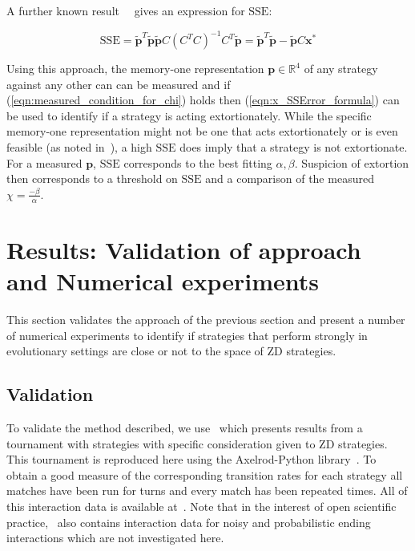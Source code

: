 \documentclass[a4paper]{article}
\newcommand{\SSe}{\text{SSE}}
\begin{document}
A further known result~~\cite{kutner2004applied, rao1973linear,
wakefield2013bayesian} gives an expression for
\(\SSe\):

\begin{equation}\label{eqn:x_SSError_formula}
    \SSe = {\tilde{\textbf{p}}} ^ T \tilde{\textbf{p}}
           \tilde{\textbf{p}} C \left(C ^ T C \right) ^ {-1} C ^ T
           \tilde{\textbf{p}} = {\tilde{\textbf{p}}} ^ T \tilde{\textbf{p}} - \tilde{\textbf{p}} C \textbf{x}^*
\end{equation}

Using this approach, the memory-one representation \(\textbf{p}\in\mathbb{R}^4\) of any
strategy against any other can can be measured and if
(\ref{eqn:measured_condition_for_chi}) holds then (\ref{eqn:x_SSError_formula})
can be used to identify if a strategy is acting extortionately. While the
specific memory-one representation might not be one that acts extortionately or
is even feasible (as noted in~\cite{Press2012}), a
high \(\SSe\) does imply that a strategy is not extortionate. For a measured
\(\textbf{p}\), \(\SSe\) corresponds to the best fitting \(\alpha, \beta\). Suspicion of
extortion then corresponds to a threshold on \(\SSe\) and a comparison of the
measured \(\chi=\frac{-\beta}{\alpha}\).

\section{Results: Validation of approach and Numerical experiments}\label{sec:numerical-experiments}

This section validates the approach of the previous section and
present a number of numerical experiments to identify if strategies that perform
strongly in evolutionary settings are close or not to the space of
ZD strategies.

\subsection{Validation}

To validate the method described, we use~\cite{Stewart2012} which
presents results from a tournament with
strategies
with specific consideration given to ZD strategies. This
tournament is reproduced here using the Axelrod-Python
library~\cite{Knight2016}. To obtain a good measure of the corresponding
transition rates for each strategy all matches have been run for
turns and every match has been
repeated times. All of this
interaction data is available at~\cite{vincent_knight_2018_1297075}. Note that
in the interest of open scientific practice,~\cite{vincent_knight_2018_1297075}
also contains interaction data for noisy and probabilistic ending interactions
which are not investigated here.
\end{document}
